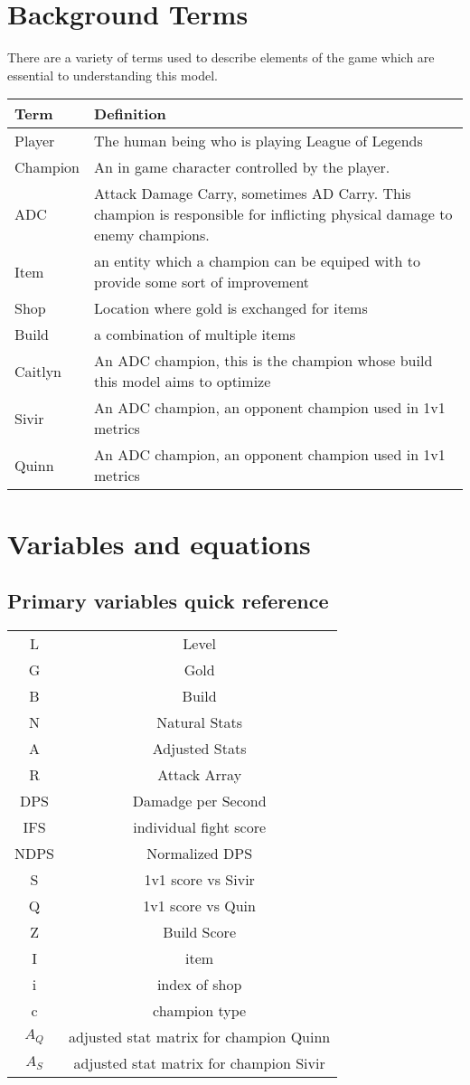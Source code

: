 \documentclass{article}
\begin{document}
\section{Background Terms}
There are a variety of terms used to describe elements of the game which are essential to understanding this model. \\
\begin{tabular}{| l| L| } \hline
   Term & Definition\\ \hline
   Player &  The human being who is playing League of Legends \\ \hline
   Champion & An in game character controlled by the player.\\ \hline
   ADC & Attack Damage Carry, sometimes AD Carry.  This champion is responsible for inflicting physical damage to enemy champions. \\ \hline
   Item & an entity which a champion can be equiped with to provide some sort of improvement \\ \hline
   Shop & Location where gold is exchanged for items\\ \hline
   Build & a combination of multiple items \\ \hline
   Caitlyn & An ADC champion, this is the champion whose build this model aims to optimize\\ \hline
   Sivir &  An ADC champion, an opponent champion used in 1v1 metrics\\ \hline
   Quinn  & An ADC champion, an opponent champion used in 1v1 metrics\\ \hline
\end{tabular}
\newpage
\section{Variables and equations}
\subsection{Primary variables quick reference}
\begin{tabular}{|c|c|}
L & Level \\
G & Gold \\
B & Build \\
N & Natural Stats \\
A & Adjusted Stats\\
R & Attack Array\\
DPS &  Damadge per Second \\
IFS & individual fight score\\
NDPS & Normalized DPS\\
S & 1v1 score vs Sivir\\
Q & 1v1 score vs Quin\\
Z & Build Score\\
I &item\\
i  & index of shop \\
c & champion type\\
$A_Q$ &  adjusted stat matrix for champion Quinn\\
$A_S$ & adjusted stat matrix for champion Sivir\\
\end{tabular}
\end{document}
